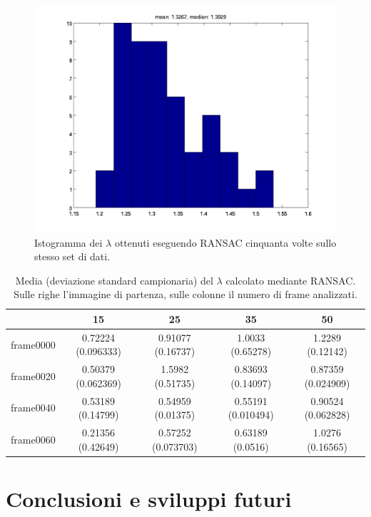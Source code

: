 \documentclass[12pt]{report}
\begin{document}
\begin{figure}[H]
	\centering
	\includegraphics[scale=.75]{images/multiRansac}
	\caption{Istogramma dei $\lambda$ ottenuti eseguendo RANSAC cinquanta volte sullo stesso set di dati.}
	\label{fig:multiRansac}
\end{figure}

\begin{table}[H]
\begin{center}
\begin{tabular}{|c|c|c|c|c|}
	\hline
	& 15 & 25 & 35 & 50 \\
	\hline
	frame0000 & 0.72224 (0.096333) & 0.91077 (0.16737) & 1.0033 (0.65278) & 1.2289 (0.12142)\\
	\hline
	frame0020 & 0.50379 (0.062369) & 1.5982 (0.51735) & 0.83693 (0.14097) & 0.87359 (0.024909)\\
	\hline
	frame0040 & 0.53189 (0.14799) & 0.54959 (0.01375) & 0.55191 (0.010494) & 0.90524 (0.062828)\\
	\hline
	frame0060 & 0.21356 (0.42649) & 0.57252 (0.073703) & 0.63189 (0.0516) & 1.0276 (0.16565)\\
	\hline
\end{tabular}
\caption{Media (deviazione standard campionaria) del $\lambda$ calcolato mediante RANSAC. Sulle righe l'immagine di partenza, sulle colonne il numero di frame analizzati.}
\label{tabRans}
\end{center}
\end{table}



\chapter{Conclusioni e sviluppi futuri}
\end{document}

